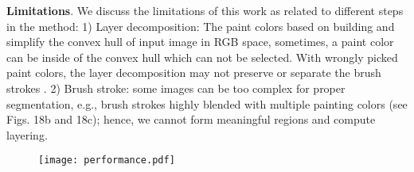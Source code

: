 \textbf{Limitations}. We discuss the limitations of this work as related to different steps in the method:
1) Layer decomposition: The paint colors based on building and simplify the  convex hull of input image in RGB space, sometimes, a paint color can be inside of the convex hull which can not be selected. With wrongly picked paint colors, the layer decomposition may not preserve or separate the brush strokes . 
2) Brush stroke: some images can be too complex for proper segmentation, e.g., brush strokes highly blended with  multiple painting colors  (see Figs. 18b and 18c); hence, we cannot form meaningful regions and compute layering.

\begin{figure}[H]
	\centering
	\texttt{[image: performance.pdf]}

\end{figure}


